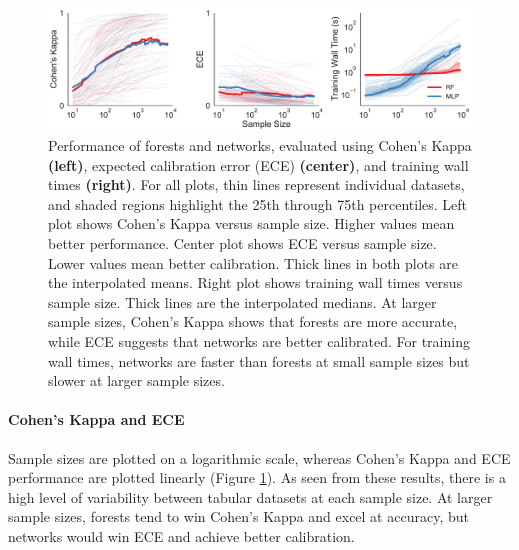 \begin{figure}[htb]
\centering
\includegraphics[width=1.0\textwidth]{figures/cc18}
  \caption{Performance of forests and networks, evaluated using Cohen's Kappa \textbf{(left)}, expected calibration error (ECE) \textbf{(center)}, and training wall times \textbf{(right)}. 
  For all plots, thin lines represent individual datasets, and shaded regions highlight the 25th through 75th percentiles. Left plot shows Cohen's Kappa versus sample size. Higher values mean better performance. Center plot shows ECE versus sample size. Lower values mean better calibration. Thick lines in both plots are the interpolated means. Right plot shows training wall times versus sample size. Thick lines are the interpolated medians. 
  At larger sample sizes, Cohen's Kappa shows that forests are more accurate, while ECE suggests that networks are better calibrated. For training wall times, networks are faster than forests at small sample sizes but slower at larger sample sizes.
  }
\label{fig:tab}
\end{figure}

\paragraph{Cohen's Kappa and ECE}
Sample sizes are plotted on a logarithmic scale, whereas Cohen's Kappa and ECE performance are plotted linearly (Figure \ref{fig:tab}). As seen from these results, there is a high level of variability between tabular datasets at each sample size. At larger sample sizes, forests tend to win Cohen's Kappa and excel at accuracy, but networks would win ECE and achieve better calibration.

